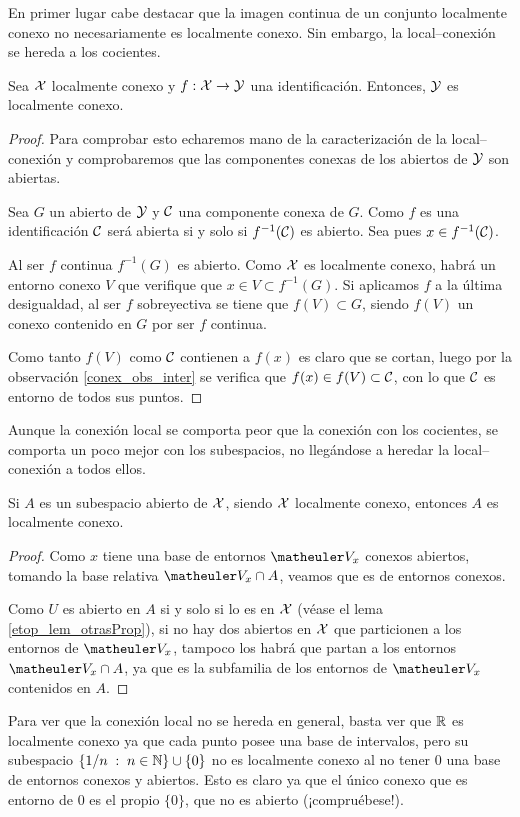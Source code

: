 En primer lugar cabe destacar que la imagen continua de un conjunto localmente conexo no necesariamente es localmente conexo. Sin embargo, la local--conexión se hereda a los cocientes.
\begin{prop}
	Sea $\mathcal{X}$ localmente conexo y $f:\mathcal{X}\to\mathcal{Y}$ una identificación. Entonces, $\mathcal{Y}$ es localmente conexo.
\end{prop}
\begin{proof}
	Para comprobar esto echaremos mano de la caracterización de la local--conexión y comprobaremos que las componentes conexas de los abiertos de $\mathcal{Y}$ son abiertas.
	
	Sea $G$ un abierto de $\mathcal{Y}$ y $\mathcal{C}$ una componente conexa de $G$. Como $f$ es una identificación $\mathcal{C}$ será abierta si y solo si $f^{-1}(\mathcal{C})$ es abierto. Sea pues $x\in f^{-1}(\mathcal{C})$.
	
	Al ser $f$ continua $f^{-1}(G)$ es abierto. Como $\mathcal{X}$ es localmente conexo, habrá un entorno conexo $V$ que verifique que $x\in V\subset f^{-1}(G)$. Si aplicamos $f$ a la última desigualdad, al ser $f$ sobreyectiva se tiene que $f(V)\subset G$, siendo $f(V)$ un conexo contenido en $G$ por ser $f$ continua.
	
	Como tanto $f(V)$ como $\mathcal{C}$ contienen a $f(x)$ es claro que se cortan, luego por la observación \ref{conex_obs_inter} se verifica que $f(x)\in f(V)\subset \mathcal{C}$, con lo que $\mathcal{C}$ es entorno de todos sus puntos.
\end{proof}
Aunque la conexión local se comporta peor que la conexión con los cocientes, se comporta un poco mejor con los subespacios, no llegándose a heredar la local--conexión a todos ellos.
\begin{lem}
	Si $A$ es un subespacio abierto de $\mathcal{X}$, siendo $\mathcal{X}$ localmente conexo, entonces $A$ es localmente conexo.
\end{lem}
\begin{proof}
	Como $x$ tiene una base de entornos $\Va{x}$ conexos abiertos, tomando la base relativa $\Va{x}\cap A$, veamos que es de entornos conexos.
	
	Como $U$ es abierto en $A$ si y solo si lo es en $\mathcal{X}$ (véase el lema \ref{etop_lem_otrasProp}), si no hay dos abiertos en $\mathcal{X}$ que particionen a los entornos de $\Va{x}$, tampoco los habrá que partan a los entornos $\Va{x}\cap A$, ya que es la subfamilia de los entornos de $\Va{x}$ contenidos en $A$.
\end{proof}
\begin{obs}[Contraejemplo]
	Para ver que la conexión local no se hereda en general, basta ver que $\mathbb{R}$ es localmente conexo ya que cada punto posee una base de intervalos, pero su subespacio $\{1/n\;:\; n\in\mathbb{N}\}\cup\{0\}$ no es localmente conexo al no tener $0$ una base de entornos conexos y abiertos. Esto es claro ya que el único conexo que es entorno de $0$ es el propio $\{0\}$, que no es abierto (¡compruébese!).
\end{obs}
